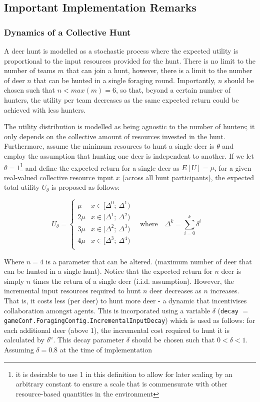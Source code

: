 \newpage
\subsection{Important Implementation Remarks}
\subsubsection{Dynamics of a Collective Hunt}

A deer hunt is modelled as a stochastic process where the expected utility is proportional to the input resources provided for the hunt. There is no limit to the number of teams $m$ that can join a hunt, however, there is a limit to the number of deer $n$ that can be hunted in a single foraging round. Importantly, $n$ should be chosen such that $n < max(m) = 6$, so that, beyond a certain number of hunters, the utility per team decreases as the same expected return could be achieved with less hunters. 

The utility distribution is modelled as being agnostic to the number of hunters; it only depends on the collective amount of resources invested in the hunt. Furthermore, assume the minimum resources to hunt a single deer is $\theta$ and employ the assumption that hunting one deer is independent to another. If we let $\theta=1$\footnote{it is desirable to use 1 in this definition to allow for later scaling by an arbitrary constant to ensure a scale that is commensurate with other resource-based quantities in the environment} and define the expected return for a single deer as $E[U]=\mu$, for a given real-valued collective resource input $x$ (across all hunt participants), the expected total utility $U_{\theta}$ is proposed as follows:

\begin{equation}
U_{\theta}=\left\{\begin{array}{ll}
\mu & x \in[\Delta^0; \ \Delta^1)\\
2 \mu & x\in[\Delta^1; \ \Delta^2)\\
3 \mu & x\in[\Delta^2; \ \Delta^3)\\
4 \mu & x\in[\Delta^3; \ \Delta^4)\\
\end{array}\right.  \quad \text{where} \quad \Delta^k= \sum_{i=0}^k\delta^i  \quad 
\end{equation}

Where $n=4$ is a parameter that can be altered. (maximum number of deer that can be hunted in a single hunt). Notice that the expected return for $n$ deer is simply $n$ times the return of a single deer (i.i.d. assumption). However, the incremental input resources required to hunt $n$ deer decreases as $n$ increases. That is, it costs less (per deer) to hunt more deer - a dynamic that incentivises collaboration amongst agents. This is incorporated using a variable $\delta$ (\texttt{decay} $=$ \texttt{gameConf.ForagingConfig.IncrementalInputDecay}) which is used as follows: for each additional deer (above 1), the incremental cost required to hunt it is calculated by $\delta^n$. This decay parameter $\delta$ should be chosen such that $0< \delta< 1$. Assuming $\delta=0.8$ at the time of implementation 

